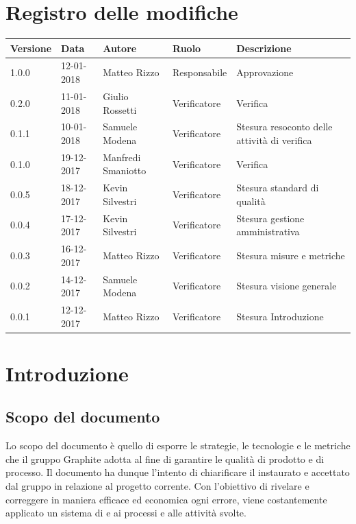 \documentclass[openany,12pt,a4paper]{report}
\begin{document}
\chapter*{Registro delle modifiche}
\begin{center}	
	\begin{tabular}{|l|l|l|l|p{4cm}|}
		\hline
		\textbf{Versione} & \textbf{Data} & \textbf{Autore} & \textbf{Ruolo} & \textbf{Descrizione} \\
		\hline 1.0.0 & 12-01-2018 & Matteo Rizzo & Responsabile & Approvazione \\
		\hline 0.2.0 & 11-01-2018 & Giulio Rossetti & Verificatore & Verifica \\
		\hline 0.1.1 & 10-01-2018 & Samuele Modena & Verificatore & Stesura resoconto delle attività di verifica \\
		\hline 0.1.0 & 19-12-2017 & Manfredi Smaniotto & Verificatore & Verifica \\		
		\hline 0.0.5 & 18-12-2017 & Kevin Silvestri & Verificatore & Stesura standard di qualità \\
		\hline 0.0.4 & 17-12-2017 & Kevin Silvestri & Verificatore & Stesura gestione amministrativa \\		
		\hline 0.0.3 & 16-12-2017 & Matteo Rizzo & Verificatore & Stesura misure e metriche \\
		\hline 0.0.2 & 14-12-2017 & Samuele Modena & Verificatore & Stesura visione generale \\
		\hline 0.0.1 & 12-12-2017 & Matteo Rizzo & Verificatore & Stesura Introduzione \\
		\hline
		
	\end{tabular}
\end{center}

\tableofcontents


\chapter{Introduzione}

    \section{Scopo del documento}
    
    Lo scopo del documento è quello di esporre le strategie, le tecnologie e le metriche che il gruppo Graphite adotta al fine di garantire le qualità di prodotto e di processo. Il documento ha dunque l'intento di chiarificare il  instaurato e accettato dal gruppo in relazione al progetto corrente. Con l'obiettivo di rivelare e correggere in maniera efficace ed economica ogni errore, viene costantemente applicato un sistema di  e  ai processi e alle attività svolte.
    
\end{document}
